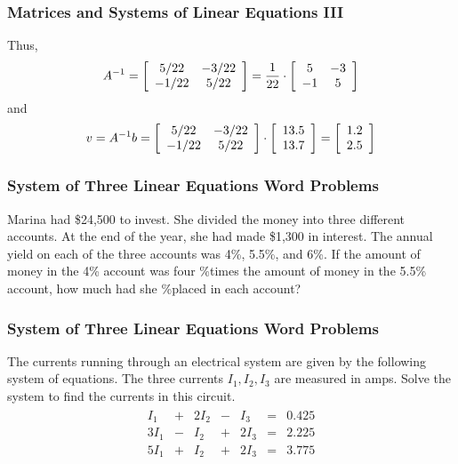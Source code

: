 \documentclass[xcolor=dvipsnames]{beamer}
\begin{document}
\begin{frame}
  \frametitle{Matrices and Systems of Linear Equations III}
Thus,
\begin{equation}
  \label{eq:oogeujie}
  A^{-1}=\left[\begin{array}{cc}
 5/22  & -3/22 \\
 -1/22 & 5/22
               \end{array}\right]=\frac{1}{22}\cdot\left[
               \begin{array}{cc}
                 5 & -3 \\
                 -1 & 5
               \end{array}\right]\notag
\end{equation}
and
\begin{equation}
  \label{eq:seeleeje}
  v=A^{-1}b=\left[\begin{array}{cc}
 5/22  & -3/22 \\
 -1/22 & 5/22
  \end{array}\right]\cdot
\left[\begin{array}{c}
 13.5   \\
 13.7  
  \end{array}\right]=\left[\begin{array}{c}
 1.2   \\
 2.5  
  \end{array}\right]\notag
\end{equation}
\end{frame}


\begin{frame}
  \frametitle{System of Three Linear Equations Word Problems}
  {\ubung} Marina had \$24,500 to invest. She divided the money into
  three different accounts. At the end of the year, she had made
  \$1,300 in interest. The annual yield on each of the three accounts
  was 4\%, 5.5\%, and 6\%. If the amount of money in the 4\% account
  was four \%times the amount of money in the 5.5\% account, how much
  had she \%placed in each account?
\end{frame}

\begin{frame}
  \frametitle{System of Three Linear Equations Word Problems}
  {\ubung} The currents running through an electrical system are given
  by the following system of equations. The three currents $I_{1},I_{2},I_{3}$
  are measured in amps. Solve the system to find the currents in this
  circuit.
  \begin{align}
    \label{eq:oemeyeib}
    \begin{array}{clclclc}
    I_{1} & + & 2I_{2} & - & I_{3} & = & 0.425 \\
    3I_{1} & - & I_{2} & + & 2I_{3} & = & 2.225 \\
    5I_{1} & + & I_{2} & + & 2I_{3} & = & 3.775
    \end{array}
  \end{align}
\end{frame}
\end{document}
